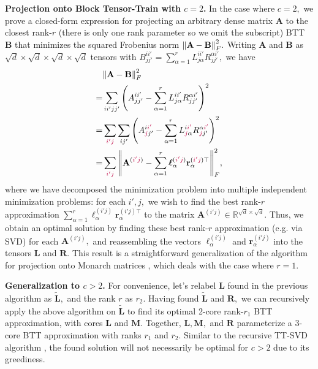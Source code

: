 \documentclass{article}
\newcommand{\mbf}[1]{{\boldsymbol{\mathbf{#1}}}}
\newcommand{\bm}{\mbf}
\theoremstyle{plain}
\theoremstyle{definition}
\theoremstyle{remark}
\newcommand{\tc}[1]{\textcolor{purple}{#1}}
\newcommand{\R}{\mathbb{R}}
\begin{document}
\noindent \textbf{Projection onto Block Tensor-Train with $c=2$.} \quad
In the case where $c=2,$ we prove a closed-form expression for projecting an arbitrary dense matrix $\bm{A}$ to the closest rank-$r$ (there is only one rank parameter so we omit the subscript) BTT $\bm{B}$ that minimizes the squared Frobenius norm $\norm{\bm{A} - \bm{B}}^2_F.$ Writing $\bm{A}$ and $\bm{B}$ as $\sqrt{d} \times \sqrt{d} \times \sqrt{d} \times \sqrt{d}$ tensors with $B^{ii'}_{jj'} = \sum_{\alpha=1}^{r} L^{ii'}_{j\alpha} R^{\alpha i'}_{j j'},$ we have
\begin{align}
    & \norm{\bm{A} - \bm{B}}^2_F  \\
    =& \sum_{ii'jj'} \qty(A^{ii'}_{jj'} - \sum_{\alpha=1}^{r} L^{ii'}_{j\alpha} R^{\alpha i'}_{j j'})^2 \\
    =& \sum_{\tc{i'j}} \sum_{ij'} \qty(A^{i\tc{i'}}_{\tc{j}j'} - \sum_{\alpha=1}^{r} L^{i\tc{i'}}_{\tc{j}\alpha} R^{\alpha \tc{i'}}_{\tc{j} j'})^2 \\
    =& \sum_{\tc{i'j}}  \norm{\bm{A}^{(\tc{i'j})} - \sum_{\alpha=1}^{r} \bm{\ell}^{(\tc{i'j})}_\alpha \bm{r}^{(\tc{i'j})\top}_\alpha}^2_F, \\
\end{align}
where we have decomposed the minimization problem into multiple independent minimization problems: for each $i',j,$ we wish to find the best rank-$r$ approximation $\sum_{\alpha=1}^{r} \bm{\ell}^{(i'j)}_\alpha \bm{r}^{(i'j)\top}_\alpha$ to the matrix $\bm{A}^{(i'j)} \in \R^{\sqrt{d} \times \sqrt{d}}.$ Thus, we obtain an optimal solution by finding these best rank-$r$ approximation (e.g. via SVD) for each $\bm{A}^{(i'j)},$   and reassembling the vectors $\bm{\ell}^{(i'j)}_\alpha$ and $\bm{r}^{(i'j)}_\alpha$ into the tensors $\bm{L}$ and $\bm{R}.$ This result is a straightforward generalization of the algorithm for projection onto Monarch matrices \citep{dao2022monarch}, which deals with the case where $r=1.$

\noindent \textbf{Generalization to $c > 2$.} \quad For convenience, let's relabel $\bm{L}$ found in the previous algorithm as $\bm{\tilde{L}},$ and the rank $r$ as $r_2.$ Having found $\bm{\tilde{L}}$ and $\bm{R},$ we can recursively apply the above algorithm on $\bm{\tilde{L}}$ to find its optimal 2-core rank-$r_1$ BTT approximation, with cores $\bm{L}$ and $\bm{M}$. Together, $\bm{L}, \bm{M},$ and $\bm{R}$ parameterize a 3-core BTT approximation with ranks $r_1$ and $r_2.$ Similar to the recursive TT-SVD algorithm \citep{oseledets2011tt}, the found solution will not necessarily be optimal for $c > 2$ due to its greediness.
\end{document}

